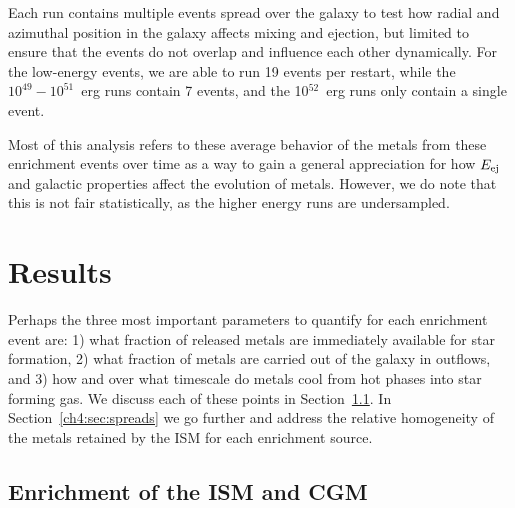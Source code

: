 Each run contains multiple events spread over the galaxy to test how radial and azimuthal position in the galaxy affects mixing and ejection, but limited to ensure that the events do not overlap and influence each other dynamically. For the low-energy events, we are able to run 19 events per restart, while the $10^{49}-10^{51}$~erg runs contain 7 events, and the 10$^{52}$~erg runs only contain a single event.

Most of this analysis refers to these average behavior of the metals from these enrichment events over time as a way to gain a general appreciation for how $E_{\rm ej}$ and galactic properties affect the evolution of metals. However, we do note that this is not fair statistically, as the higher energy runs are undersampled.



\section{Results}
\label{ch4:sec:results}
Perhaps the three most important parameters to quantify for each enrichment event are: 1) what fraction of released metals are immediately available for star formation, 2) what fraction of metals are carried out of the galaxy in outflows, and 3) how and over what timescale do metals cool from hot phases into star forming gas. We discuss each of these points in Section~\ref{ch4:sec:ISM CGM}. In Section~\ref{ch4:sec:spreads} we go further and address the relative homogeneity of the metals retained by the ISM for each enrichment source.

\subsection{Enrichment of the ISM and CGM}
\label{ch4:sec:ISM CGM}

